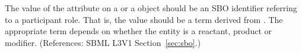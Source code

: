 The value of the attribute  on a \SpeciesReference or a
\ModifierSpeciesReference object should be an SBO identifier referring to a
participant role.  That is, the value should be a term derived from
\sboparticipantrole.  The appropriate term depends on whether the entity is
a reactant, product or modifier.  (References: SBML L3V1
Section~\ref{sec:sbo}.)
